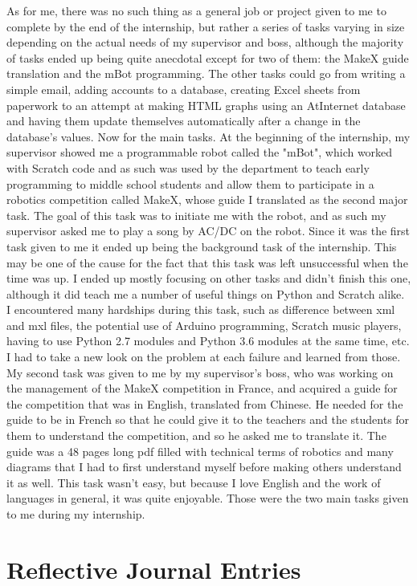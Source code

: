 \documentclass[12pt]{article}
\begin{document}
As for me, there was no such thing as a general job or project given to me to complete by the end of the internship, but rather a series of tasks varying in size depending on the actual needs of my supervisor and boss, although the majority of tasks ended up being quite anecdotal except for two of them: the MakeX guide translation and the mBot programming. The other tasks could go from writing a simple email, adding accounts to a database, creating Excel sheets from paperwork to an attempt at making HTML graphs using an AtInternet database and having them update themselves automatically after a change in the database's values. Now for the main tasks. At the beginning of the internship, my supervisor showed me a programmable robot called the "mBot", which worked with Scratch code and as such was used by the department to teach early programming to middle school students and allow them to participate in a robotics competition called MakeX, whose guide I translated as the second major task. The goal of this task was to initiate me with the robot, and as such my supervisor asked me to play a song by AC/DC on the robot. Since it was the first task given to me it ended up being the background task of the internship. This may be one of the cause for the fact that this task was left unsuccessful when the time was up. I ended up mostly focusing on other tasks and didn't finish this one, although it did teach me a number of useful things on Python and Scratch alike. I encountered many hardships during this task, such as difference between xml and mxl files, the potential use of Arduino programming, Scratch music players, having to use Python 2.7 modules and Python 3.6 modules at the same time, etc. I had to take a new look on the problem at each failure and learned from those. My second task was given to me by my supervisor's boss, who was working on the management of the MakeX competition in France, and acquired a guide for the competition that was in English, translated from Chinese. He needed for the guide to be in French so that he could give it to the teachers and the students for them to understand the competition, and so he asked me to translate it. The guide was a 48 pages long pdf filled with technical terms of robotics and many diagrams that I had to first understand myself before making others understand it as well. This task wasn't easy, but because I love English and the work of languages in general, it was quite enjoyable. Those were the two main tasks given to me during my internship.

\section{Reflective Journal Entries}
\end{document}
